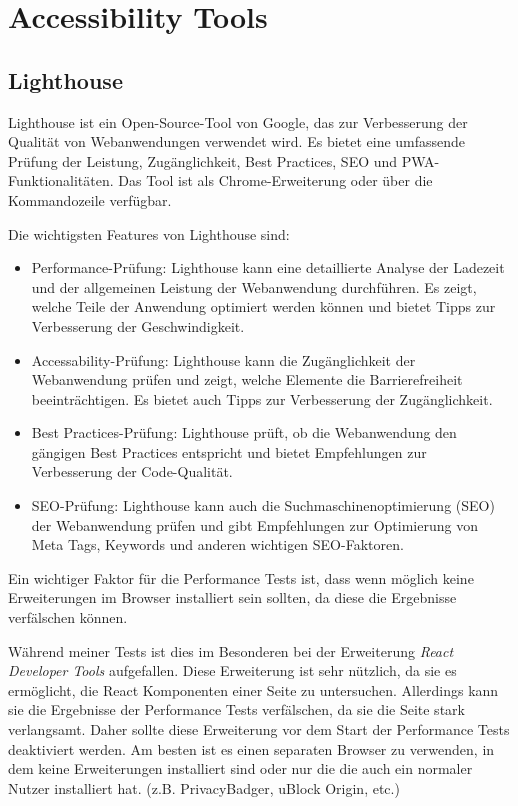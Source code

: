 \chapter{Accessibility Tools}
\label{AccessabilityTools}

\section{Lighthouse}
\label{sec:a11yToolsLighthouse}

Lighthouse ist ein Open-Source-Tool von Google, das zur Verbesserung der Qualität von Webanwendungen verwendet wird. Es bietet eine umfassende Prüfung der Leistung, Zugänglichkeit, Best Practices, SEO und PWA-Funktionalitäten. Das Tool ist als Chrome-Erweiterung oder über die Kommandozeile verfügbar.

Die wichtigsten Features von Lighthouse sind:

\begin{itemize}
    \item Performance-Prüfung: Lighthouse kann eine detaillierte Analyse der Ladezeit und der allgemeinen Leistung der Webanwendung durchführen. Es zeigt, welche Teile der Anwendung optimiert werden können und bietet Tipps zur Verbesserung der Geschwindigkeit.
    \item Accessability-Prüfung: Lighthouse kann die Zugänglichkeit der Webanwendung prüfen und zeigt, welche Elemente die Barrierefreiheit beeinträchtigen. Es bietet auch Tipps zur Verbesserung der Zugänglichkeit.
    \item Best Practices-Prüfung: Lighthouse prüft, ob die Webanwendung den gängigen Best Practices entspricht und bietet Empfehlungen zur Verbesserung der Code-Qualität.
    \item SEO-Prüfung: Lighthouse kann auch die Suchmaschinenoptimierung (SEO) der Webanwendung prüfen und gibt Empfehlungen zur Optimierung von Meta Tags, Keywords und anderen wichtigen SEO-Faktoren.
\end{itemize}

Ein wichtiger Faktor für die Performance Tests ist, dass wenn möglich keine Erweiterungen im Browser installiert sein sollten, da diese die Ergebnisse verfälschen können.

Während meiner Tests ist dies im Besonderen bei der Erweiterung \textit{React Developer Tools} aufgefallen. Diese Erweiterung ist sehr nützlich, da sie es ermöglicht, die React Komponenten einer Seite zu untersuchen. Allerdings kann sie die Ergebnisse der Performance Tests verfälschen, da sie die Seite stark verlangsamt. Daher sollte diese Erweiterung vor dem Start der Performance Tests deaktiviert werden. Am besten ist es einen separaten Browser zu verwenden, in dem keine Erweiterungen installiert sind oder nur die die auch ein normaler Nutzer installiert hat. (z.B. PrivacyBadger, uBlock Origin, etc.)

